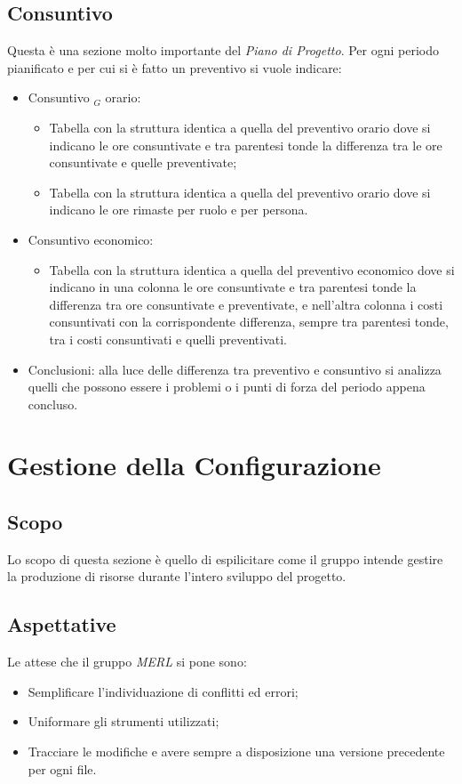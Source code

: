 \subsection{Consuntivo}
Questa è una sezione molto importante del \textit{Piano di Progetto}.
Per ogni periodo pianificato e per cui si è fatto un preventivo si vuole indicare:
\begin{itemize}
    \item Consuntivo $_G$ orario:
        \begin{itemize}
            \item Tabella con la struttura identica a quella del preventivo orario dove si indicano le ore consuntivate e tra parentesi tonde la differenza tra le ore consuntivate e quelle preventivate;
            \item Tabella con la struttura identica a quella del preventivo orario dove si indicano le ore rimaste per ruolo e per persona.
        \end{itemize}
    \item Consuntivo economico:
        \begin{itemize}
            \item Tabella con la struttura identica a quella del preventivo economico dove si indicano in una colonna le ore consuntivate e tra parentesi tonde la differenza tra ore consuntivate e preventivate, e nell'altra colonna i costi consuntivati con la corrispondente differenza, sempre tra parentesi tonde, tra i costi consuntivati e quelli preventivati.
        \end{itemize}
    \item Conclusioni: alla luce delle differenza tra preventivo e consuntivo si analizza quelli che possono essere i problemi o i punti di forza del periodo appena concluso.
\end{itemize}


\section{Gestione della Configurazione}
\subsection{Scopo}
    Lo scopo di questa sezione è quello di espilicitare come il gruppo intende gestire la produzione di
    risorse durante l'intero sviluppo del progetto.
 \subsection{Aspettative}
    Le attese che il gruppo \textit{MERL} si pone sono:
    \begin{itemize}
        \item Semplificare l'individuazione di conflitti ed errori;
        \item Uniformare gli strumenti utilizzati;
        \item Tracciare le modifiche e avere sempre a disposizione una versione precedente per ogni file.
    \end{itemize}
